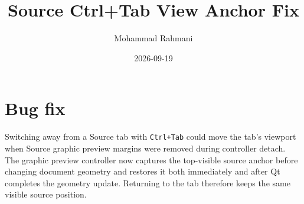 \documentclass[a4paper]{article}
\title{Source Ctrl+Tab View Anchor Fix}
\date{2026-09-19}
\author{Mohammad Rahmani}
\begin{document}
\maketitle

\section{Bug fix}

Switching away from a Source tab with \texttt{Ctrl+Tab} could move the tab's
viewport when Source graphic preview margins were removed during controller
detach.  The graphic preview controller now captures the top-visible source
anchor before changing document geometry and restores it both immediately and
after Qt completes the geometry update.  Returning to the tab therefore keeps
the same visible source position.
\end{document}
